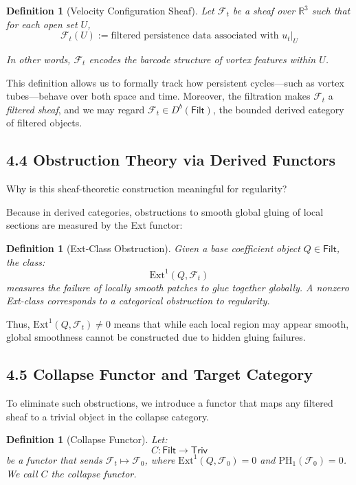 \documentclass[11pt]{article}
\newtheorem{definition}[theorem]{Definition}
\begin{document}
\begin{definition}[Velocity Configuration Sheaf]
Let \( \mathcal{F}_t \) be a sheaf over \( \mathbb{R}^3 \) such that for each open set \( U \),  
\[
\mathcal{F}_t(U) := \text{filtered persistence data associated with } u_t|_U
\]

In other words, \( \mathcal{F}_t \) encodes the barcode structure of vortex features within \( U \).
\end{definition}

This definition allows us to formally track how persistent cycles—such as vortex tubes—behave over both space and time.  
Moreover, the filtration makes \( \mathcal{F}_t \) a \emph{filtered sheaf}, and we may regard \( \mathcal{F}_t \in D^b(\mathsf{Filt}) \),  
the bounded derived category of filtered objects.

\subsection{4.4 Obstruction Theory via Derived Functors}

Why is this sheaf-theoretic construction meaningful for regularity?

Because in derived categories, obstructions to smooth global gluing of local sections are measured by the Ext functor:

\begin{definition}[Ext-Class Obstruction]
Given a base coefficient object \( Q \in \mathsf{Filt} \), the class:
\[
\mathrm{Ext}^1(Q, \mathcal{F}_t)
\]
measures the failure of locally smooth patches to glue together globally.  
A nonzero Ext-class corresponds to a categorical obstruction to regularity.
\end{definition}

Thus, \( \mathrm{Ext}^1(Q, \mathcal{F}_t) \neq 0 \) means that while each local region may appear smooth,  
global smoothness cannot be constructed due to hidden gluing failures.

\subsection{4.5 Collapse Functor and Target Category}

To eliminate such obstructions, we introduce a functor that maps any filtered sheaf to a trivial object in the collapse category.

\begin{definition}[Collapse Functor]
Let:
\[
C: \mathsf{Filt} \to \mathsf{Triv}
\]
be a functor that sends \( \mathcal{F}_t \mapsto \mathcal{F}_0 \),  
where \( \mathrm{Ext}^1(Q, \mathcal{F}_0) = 0 \) and \( \mathrm{PH}_1(\mathcal{F}_0) = 0 \).  
We call \( C \) the \emph{collapse functor}.
\end{definition}
\end{document}
